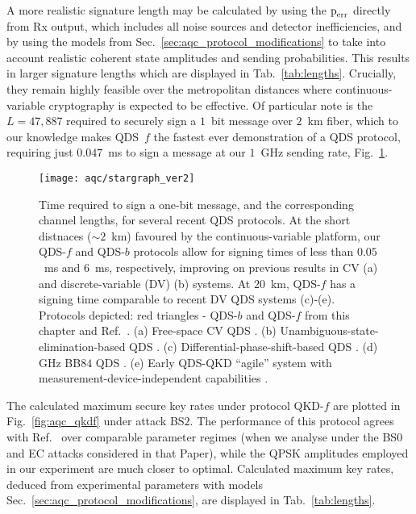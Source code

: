 A more realistic signature length may be calculated by using the $\text{p}_{\text{err}}$ directly from Rx output, which includes all noise sources and detector inefficiencies, and by using the models from Sec.~\ref{sec:aqc_protocol_modifications} to take into account realistic coherent state amplitudes and sending probabilities. This results in larger signature lengths which are displayed in Tab.~\ref{tab:lengths}. Crucially, they remain highly feasible over the metropolitan distances where continuous-variable cryptography is expected to be effective. Of particular note is the $L = 47,887$ required to securely sign a $1$~bit message over $2$~km fiber, which to our knowledge makes QDS~$f$ the fastest ever demonstration of a QDS protocol, requiring just $0.047$~ms to sign a message at our $1$~GHz sending rate, Fig.~\ref{fig:aqc_star}.

\begin{figure}[htp]
\captionsetup{width=\linewidth}
\centering
\texttt{[image: aqc/stargraph\_ver2]}
\caption{\label{fig:aqc_star} Time required to sign a one-bit message, and the corresponding channel lengths, for several recent QDS protocols. At the short distnaces ($\sim 2$~km) favoured by the continuous-variable platform, our QDS-$f$ and QDS-$b$ protocols allow for signing times of less than $0.05$~ms and $6$~ms, respectively, improving on previous results in CV (a) and discrete-variable (DV) (b) systems. At $20$~km, QDS-$f$ has a signing time comparable to recent DV QDS systems (c)-(e). Protocols depicted: red triangles - QDS-$b$ and QDS-$f$ from this chapter and Ref.~\cite{Richter2020}. (a) Free-space CV QDS \cite{Croal2016}. (b) Unambiguous-state-elimination-based QDS \cite{Donaldson2016}. (c) Differential-phase-shift-based QDS \cite{Collins2016}. (d) GHz BB$84$ QDS \cite{An2019}. (e) Early QDS-QKD ``agile'' system with measurement-device-independent capabilities \cite{Roberts2017}.}
\end{figure}


The calculated maximum secure key rates under protocol QKD-$f$ are plotted in Fig.~\ref{fig:aqc_qkdf} under attack BS$2$. The performance of this protocol agrees with Ref.~\cite{Papanastasiou2018} over comparable parameter regimes (when we analyse under the BS$0$ and EC attacks considered in that Paper), while the QPSK amplitudes employed in our experiment are much closer to optimal. Calculated maximum key rates, deduced from experimental parameters with models Sec.~\ref{sec:aqc_protocol_modifications}, are displayed in Tab.~\ref{tab:lengths}.

